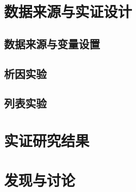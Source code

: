 \documentclass[
  12pt,
]{ctexart}
\begin{document}
\hypertarget{ux6570ux636eux6765ux6e90ux4e0eux5b9eux8bc1ux8bbeux8ba1}{%
\section{数据来源与实证设计}\label{ux6570ux636eux6765ux6e90ux4e0eux5b9eux8bc1ux8bbeux8ba1}}

\hypertarget{ux6570ux636eux6765ux6e90ux4e0eux53d8ux91cfux8bbeux7f6e}{%
\subsection{数据来源与变量设置}\label{ux6570ux636eux6765ux6e90ux4e0eux53d8ux91cfux8bbeux7f6e}}

\hypertarget{ux6790ux56e0ux5b9eux9a8c}{%
\subsection{析因实验}\label{ux6790ux56e0ux5b9eux9a8c}}

\hypertarget{ux5217ux8868ux5b9eux9a8c}{%
\subsection{列表实验}\label{ux5217ux8868ux5b9eux9a8c}}

\hypertarget{ux5b9eux8bc1ux7814ux7a76ux7ed3ux679c}{%
\section{实证研究结果}\label{ux5b9eux8bc1ux7814ux7a76ux7ed3ux679c}}

\hypertarget{ux53d1ux73b0ux4e0eux8ba8ux8bba}{%
\section{发现与讨论}\label{ux53d1ux73b0ux4e0eux8ba8ux8bba}}
\end{document}
